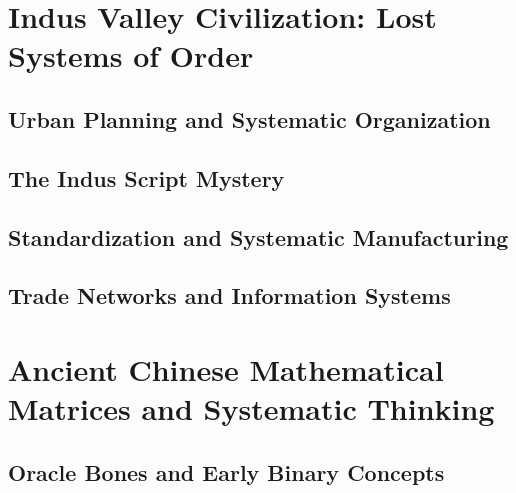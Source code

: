 \documentclass[12pt, oneside, openany]{book}
\begin{document}
\chapter{Indus Valley Civilization: Lost Systems of Order}

\section{Urban Planning and Systematic Organization}

\section{The Indus Script Mystery}

\section{Standardization and Systematic Manufacturing}

\section{Trade Networks and Information Systems}


\chapter{Ancient Chinese Mathematical Matrices and Systematic Thinking}

\section{Oracle Bones and Early Binary Concepts}
\end{document}
